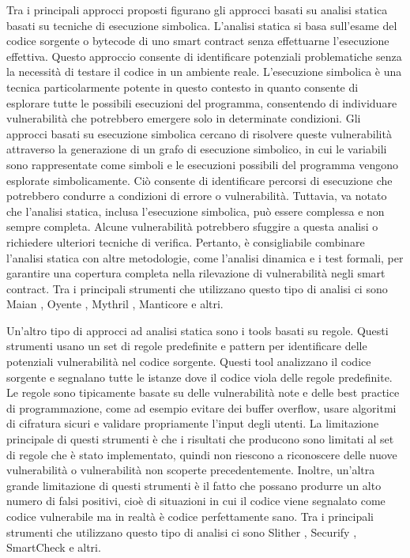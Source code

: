 \documentclass[../../Thesis.tex]{subfiles}
\begin{document}
Tra i principali approcci proposti figurano gli approcci basati su analisi statica basati su tecniche di esecuzione simbolica. L'analisi statica si basa sull'esame del codice sorgente o bytecode di uno smart contract senza effettuarne l'esecuzione effettiva. Questo approccio consente di identificare potenziali problematiche senza la necessità di testare il codice in un ambiente reale. L'esecuzione simbolica è una tecnica particolarmente potente in questo contesto in quanto consente di esplorare tutte le possibili esecuzioni del programma, consentendo di individuare vulnerabilità che potrebbero emergere solo in determinate condizioni.
Gli approcci basati su esecuzione simbolica cercano di risolvere queste vulnerabilità attraverso la generazione di un grafo di esecuzione simbolico, in cui le variabili sono rappresentate come simboli e le esecuzioni possibili del programma vengono esplorate simbolicamente. Ciò consente di identificare percorsi di esecuzione che potrebbero condurre a condizioni di errore o vulnerabilità.
Tuttavia, va notato che l'analisi statica, inclusa l'esecuzione simbolica, può essere complessa e non sempre completa. Alcune vulnerabilità potrebbero sfuggire a questa analisi o richiedere ulteriori tecniche di verifica. Pertanto, è consigliabile combinare l'analisi statica con altre metodologie, come l'analisi dinamica e i test formali, per garantire una copertura completa nella rilevazione di vulnerabilità negli smart contract. Tra i principali strumenti che utilizzano questo tipo di analisi ci sono Maian \cite{Maian, Maian2}, Oyente \cite{Oyente, Oyente2}, Mythril \cite{Mythril}, Manticore \cite{Manticore} e altri.

Un'altro tipo di approcci ad analisi statica sono i tools basati su regole. Questi strumenti usano un set di regole predefinite e pattern per identificare delle potenziali vulnerabilità nel codice sorgente. Questi tool analizzano il codice sorgente e segnalano tutte le istanze dove il codice viola delle regole predefinite. Le regole sono tipicamente basate su delle vulnerabilità note e delle best practice di programmazione, come ad esempio evitare dei buffer overflow, usare algoritmi di cifratura sicuri e validare propriamente l'input degli utenti. La limitazione principale di questi strumenti è che i risultati che producono sono limitati al set di regole che è stato implementato, quindi non riescono a riconoscere delle nuove vulnerabilità o vulnerabilità non scoperte precedentemente. Inoltre, un'altra grande limitazione di questi strumenti è il fatto che possano produrre un alto numero di falsi positivi, cioè di situazioni in cui il codice viene segnalato come codice vulnerabile ma in realtà è codice perfettamente sano. Tra i principali strumenti che utilizzano questo tipo di analisi ci sono Slither \cite{Slither}, Securify \cite{Securify}, SmartCheck \cite{SmartCheck} e altri.
\end{document}
